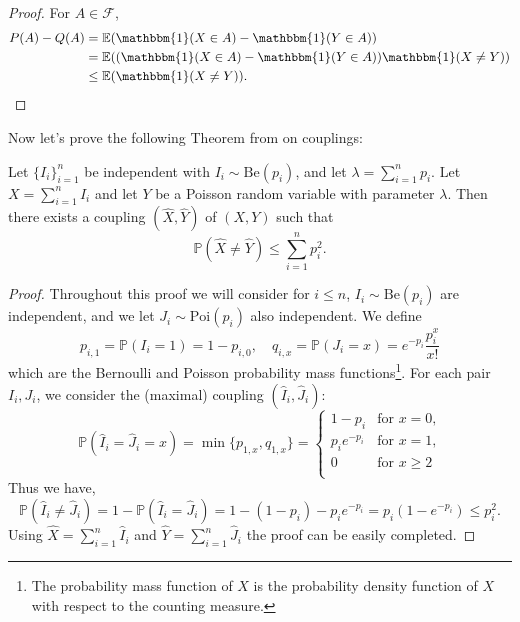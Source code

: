 \begin{proof}
	For $A \in \mathcal{F}$, 
	\begin{align}
		P(A) - Q(A) &= \mathbb{E}(\mathbbm{1}(X\in A)- \mathbbm{1}(Y\in A)) \\
				   &= \mathbb{E}((\mathbbm{1}(X\in A)- \mathbbm{1}(Y\in A))\mathbbm{1}(X \neq Y))\\ 
		     &\leq \mathbb{E}(\mathbbm{1}(X \neq Y)).
	\end{align}
\end{proof}
Now let's prove the following Theorem from \cite{Hofstad16} on couplings:
\begin{theorem}
	Let $\{I_i\}_{i=1}^n$ be independent with $I_i \sim \text{Be}(p_i)$, and let $\lambda = \sum_{i=1}^n p_i$.
	Let $X = \sum_{i=1}^n I_i$ and let $Y$ be a Poisson random variable with parameter $\lambda$.
	Then there exists a coupling $(\hat{X}, \hat{Y})$ of $(X, Y)$ such that
	\begin{equation}
		\mathbb{P}(\hat{X} \neq \hat{Y}) \leq \sum_{i=1}^n p_i^2.
	\end{equation}
\end{theorem}
\begin{proof}
	Throughout this proof we will consider for $i\leq n$,  $I_i \sim \text{Be}(p_i)$ are independent, and we let $J_i \sim \text{Poi}(p_i)$ also independent.
	We define
	\begin{equation}
		p_{i,1} = \mathbb{P}(I_i = 1) = 1-p_{i,0}, \quad q_{i,x} = \mathbb{P}(J_i = x) = e^{-p_i}\frac{p_i^x}{x!}
	\end{equation}
	which are the Bernoulli and Poisson probability mass functions\footnote{The probability mass function of $X$ is the probability density function of $X$ with respect to the counting measure.}.
	\newline
	For each pair $I_i, J_i$, we consider the (maximal) coupling $(\hat{I}_i, \hat{J}_i)$:
	\begin{equation}
		\mathbb{P}(\hat{I}_i = \hat{J}_i =x) = \min\{p_{1,x}, q_{1, x}\} = \left\{	\begin{array}{rl}
												1-p_i  &\text{for $x = 0$,}\\
												p_ie^{-p_i} &\text{for $x= 1$,}\\
												0 &\text{for $x\geq 2$}\\
											\end{array}
										\right.
	\end{equation}
	Thus we have,
	\begin{equation}
		\mathbb{P}(\hat{I}_i \neq \hat{J}_i) = 1 - \mathbb{P}(\hat{I}_i = \hat{J}_i) = 1 - (1-p_i) - p_ie^{-p_i} = p_i(1-e^{-p_i}) \leq p_i^2.
	\end{equation}
	Using $\hat{X} = \sum_{i=1}^n \hat{I}_i$ and $\hat{Y} = \sum_{i=1}^n \hat{J}_i$ the proof can be easily completed.
\end{proof}
